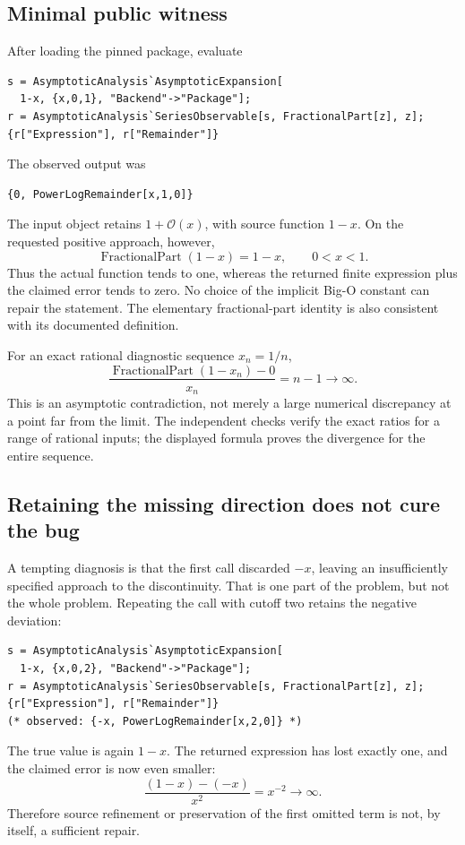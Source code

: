 \documentclass[11pt,letterpaper]{article}
\newcommand{\OO}{\mathcal{O}}
\begin{document}
\subsection{Minimal public witness}
After loading the pinned package, evaluate
\begin{lstlisting}
s = AsymptoticAnalysis`AsymptoticExpansion[
  1-x, {x,0,1}, "Backend"->"Package"];
r = AsymptoticAnalysis`SeriesObservable[s, FractionalPart[z], z];
{r["Expression"], r["Remainder"]}
\end{lstlisting}
The observed output was
\begin{lstlisting}
{0, PowerLogRemainder[x,1,0]}
\end{lstlisting}
The input object retains $1+\OO(x)$, with source function $1-x$. On the requested
positive approach, however,
\begin{equation}\label{eq:fracactual}
 \operatorname{FractionalPart}(1-x)=1-x,\qquad 0<x<1.
\end{equation}
Thus the actual function tends to one, whereas the returned finite expression
plus the claimed error tends to zero. No choice of the implicit Big-O constant
can repair the statement. The elementary fractional-part identity is also
consistent with its documented definition.~\cite{wl-fractional}

For an exact rational diagnostic sequence $x_n=1/n$,
\begin{equation}
 \frac{\operatorname{FractionalPart}(1-x_n)-0}{x_n}=n-1\longrightarrow\infty.
\end{equation}
This is an asymptotic contradiction, not merely a large numerical discrepancy
at a point far from the limit. The independent checks verify the exact ratios
for a range of rational inputs; the displayed formula proves the divergence
for the entire sequence.

\subsection{Retaining the missing direction does not cure the bug}
A tempting diagnosis is that the first call discarded $-x$, leaving an
insufficiently specified approach to the discontinuity. That is one part of
the problem, but not the whole problem. Repeating the call with cutoff two
retains the negative deviation:
\begin{lstlisting}
s = AsymptoticAnalysis`AsymptoticExpansion[
  1-x, {x,0,2}, "Backend"->"Package"];
r = AsymptoticAnalysis`SeriesObservable[s, FractionalPart[z], z];
{r["Expression"], r["Remainder"]}
(* observed: {-x, PowerLogRemainder[x,2,0]} *)
\end{lstlisting}
The true value is again $1-x$. The returned expression has lost exactly one,
and the claimed error is now even smaller:
\begin{equation}
 \frac{(1-x)-(-x)}{x^2}=x^{-2}\longrightarrow\infty.
\end{equation}
Therefore source refinement or preservation of the first omitted term is not,
by itself, a sufficient repair.
\end{document}
